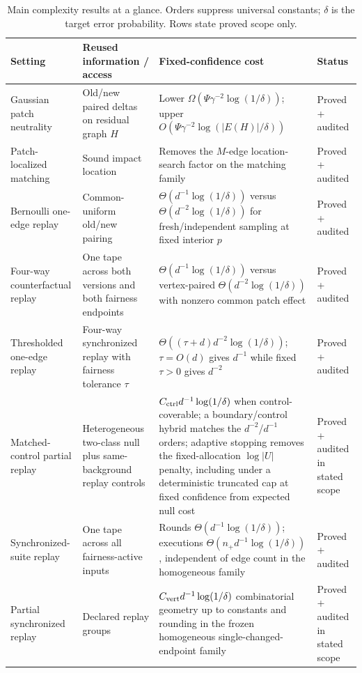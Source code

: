 \begin{table}[t]
\centering
\caption{Main complexity results at a glance.  Orders suppress universal constants;
$\delta$ is the target error probability.  Rows state proved scope only.}
\label{tab:main-results}
\small
\begin{tabular}{@{}p{}p{}p{}p{}@{}}
\toprule
Setting & Reused information / access & Fixed-confidence cost & Status \\
\midrule
Gaussian patch neutrality & Old/new paired deltas on residual graph $H$ &
Lower $\Omega(\Psi\gamma^{-2}\log(1/\delta))$; upper
$O(\Psi\gamma^{-2}\log(|E(H)|/\delta))$ & Proved + audited \\

Patch-localized matching & Sound impact location & Removes the $M$-edge
location-search factor on the matching family & Proved + audited \\

Bernoulli one-edge replay & Common-uniform old/new pairing &
$\Theta(d^{-1}\log(1/\delta))$ versus $\Theta(d^{-2}\log(1/\delta))$
for fresh/independent sampling at fixed interior $p$ & Proved + audited \\

Four-way counterfactual replay & One tape across both versions and both
fairness endpoints & $\Theta(d^{-1}\log(1/\delta))$ versus vertex-paired
$\Theta(d^{-2}\log(1/\delta))$ with nonzero common patch effect & Proved + audited \\

Thresholded one-edge replay & Four-way synchronized replay with fairness tolerance $\tau$ &
$\Theta((\tau+d)d^{-2}\log(1/\delta))$; $\tau=O(d)$ gives $d^{-1}$ while fixed $\tau>0$ gives $d^{-2}$ &
Proved + audited \\

Matched-control partial replay & Heterogeneous two-class null plus same-background replay controls &
$C_{\rm ctrl}d^{-1}\log(1/\delta)$ when control-coverable; a boundary/control hybrid matches the
$d^{-2}$/$d^{-1}$ orders; adaptive stopping removes the fixed-allocation $\log |U|$ penalty,
including under a deterministic truncated cap at fixed confidence
from expected null cost &
Proved + audited in stated scope \\

Synchronized-suite replay & One tape across all fairness-active inputs &
Rounds $\Theta(d^{-1}\log(1/\delta))$; executions
$\Theta(n_+d^{-1}\log(1/\delta))$, independent of edge count in the
homogeneous family & Proved + audited \\

Partial synchronized replay & Declared replay groups &
$C_{\rm vert}d^{-1}\log(1/\delta)$ combinatorial geometry up to constants
and rounding in the frozen homogeneous single-changed-endpoint family &
Proved + audited in stated scope \\
\bottomrule
\end{tabular}
\end{table}
